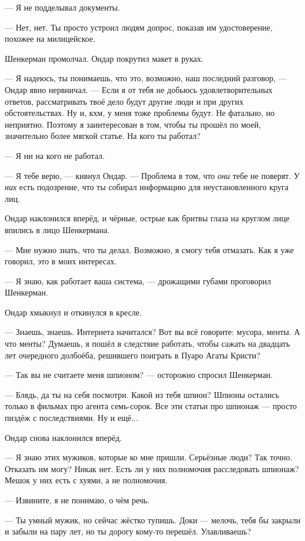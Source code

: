 \documentclass[a4paper,10pt,fleqn]{book}\usepackage{polyglossia}\setdefaultlanguage{english}\setotherlanguage{russian}\defaultfontfeatures{Ligatures=TeX,Mapping=tex-text} \usepackage{xcolor}\definecolor{lightgray}{HTML}{bbbbbb}\color{lightgray}\newcommand{\ml}[3]{\textcolor{black}{#3}}
\begin{document}
--- Я не подделывал документы.

--- Нет, нет.
Ты просто устроил людям допрос, показав им удостоверение, похожее на милицейское.

Шенкерман промолчал.
Ондар покрутил макет в руках.

--- Я надеюсь, ты понимаешь, что это, возможно, наш последний разговор, --- Ондар явно нервничал.
--- Если я от тебя не добьюсь удовлетворительных ответов, рассматривать твоё дело будут другие люди и при других обстоятельствах.
Ну и, кхм, у меня тоже проблемы будут.
Не фатально, но неприятно.
Поэтому я заинтересован в том, чтобы ты прошёл по моей, значительно более мягкой статье.
На кого ты работал?

--- Я ни на кого не работал.

--- Я тебе верю, --- кивнул Ондар.
--- Проблема в том, что \emph{они} тебе не поверят.
У \emph{них} есть подозрение, что ты собирал информацию для неустановленного круга лиц.

Ондар наклонился вперёд, и чёрные, острые как бритвы глаза на круглом лице впились в лицо Шенкермана.

--- Мне нужно знать, что ты делал.
Возможно, я смогу тебя отмазать.
Как я уже говорил, это в моих интересах.

--- Я знаю, как работает ваша система, --- дрожащими губами проговорил Шенкерман.

Ондар хмыкнул и откинулся в кресле.

--- Знаешь, знаешь.
Интернета начитался?
Вот вы всё говорите: мусора, менты.
А что менты?
Думаешь, я пошёл в следствие работать, чтобы сажать на двадцать лет очередного долбоёба, решившего поиграть в Пуаро Агаты Кристи?

--- Так вы не считаете меня шпионом? --- осторожно спросил Шенкерман.

--- Блядь, да ты на себя посмотри.
Какой из тебя шпион?
Шпионы остались только в фильмах про агента семь-сорок.
Все эти статьи про шпионаж --- просто пиздёж с последствиями.
Ну и ещё...

Ондар снова наклонился вперёд.

--- Я знаю этих мужиков, которые ко мне пришли.
Серьёзные люди? 
Так точно.
Отказать им могу?
Никак нет.
Есть ли у них полномочия расследовать шпионаж?
Мешок у них есть с хуями, а не полномочия.

--- Извините, я не понимаю, о чём речь.

--- Ты умный мужик, но сейчас жёстко тупишь.
Доки --- мелочь, тебя бы закрыли и забыли на пару лет, но ты дорогу кому-то перешёл.
Улавливаешь?
\end{document}
